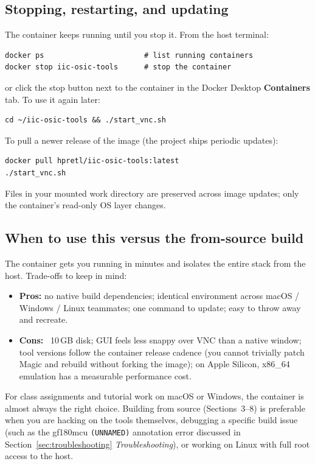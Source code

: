 \documentclass[11pt]{article}
\begin{document}
\subsection{Stopping, restarting, and updating}

The container keeps running until you stop it. From the host terminal:

\begin{lstlisting}
docker ps                       # list running containers
docker stop iic-osic-tools      # stop the container
\end{lstlisting}

\noindent or click the stop button next to the container in the Docker
Desktop \textbf{Containers} tab. To use it again later:

\begin{lstlisting}
cd ~/iic-osic-tools && ./start_vnc.sh
\end{lstlisting}

\noindent To pull a newer release of the image (the project ships
periodic updates):

\begin{lstlisting}
docker pull hpretl/iic-osic-tools:latest
./start_vnc.sh
\end{lstlisting}

\noindent Files in your mounted work directory are preserved across
image updates; only the container's read-only OS layer changes.

\subsection{When to use this versus the from-source build}

The container gets you running in minutes and isolates the entire stack
from the host. Trade-offs to keep in mind:

\begin{itemize}[leftmargin=2em]
  \item \textbf{Pros:} no native build dependencies; identical environment
        across macOS / Windows / Linux teammates; one command to update;
        easy to throw away and recreate.
  \item \textbf{Cons:} ~10\,GB disk; GUI feels less snappy over VNC than a
        native window; tool versions follow the container release cadence
        (you cannot trivially patch Magic and rebuild without forking the
        image); on Apple Silicon, x86\_64 emulation has a measurable
        performance cost.
\end{itemize}

For class assignments and tutorial work on macOS or Windows, the
container is almost always the right choice. Building from source
(Sections~3--8) is preferable when you are hacking on the tools
themselves, debugging a specific build issue (such as the gf180mcu
\texttt{(UNNAMED)} annotation error discussed in
Section~\ref{sec:troubleshooting} \emph{Troubleshooting}), or working on
Linux with full root access to the host.
\end{document}
